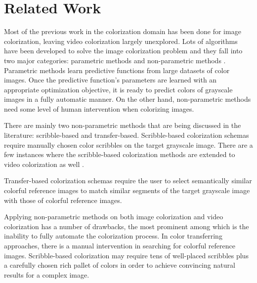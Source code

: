 \documentclass[10pt,twocolumn,letterpaper]{article}
\begin{document}
\section{Related Work}

Most of the previous work in the colorization domain has been done for image colorization, leaving video colorization largely unexplored. Lots of algorithms have been developed to solve the image colorization problem and they fall into two major categories: parametric methods \cite{DBLP:journals/corr/abs-1712-03400, DBLP:journals/corr/ChengYS16, 7410429, Iizuka:2016:LCJ:2897824.2925974, DBLP:journals/corr/LarssonMS16, DBLP:journals/corr/ZhangIE16, DBLP:journals/corr/ZhangZIGLYE17} and non-parametric methods \cite{10.1007/978-3-540-88690-7_10, Chia:2011:SCI:2070781.2024190, Gupta:2012:ICU:2393347.2393402, Huang:2005:AED:1101149.1101223, Irony:2005:CE:2383654.2383683, Levin:2004:CUO:1015706.1015780, Luan:2007:NIC:2383847.2383887, Morimoto:2009:ACG:1599301.1599333, qu-2006-manga, 1467343, Welsh:2002:TCG:566654.566576, 1621234}. Parametric methods learn predictive functions from large datasets of color images. Once the predictive function's parameters are learned with an appropriate optimization objective, it is ready to predict colors of grayscale images in a fully automatic manner. On the other hand, non-parametric methods need some level of human intervention when colorizing images.  

There are mainly two non-parametric methods that are being discussed in the literature: scribble-based and transfer-based. Scribble-based colorization schemas \cite{Huang:2005:AED:1101149.1101223, Levin:2004:CUO:1015706.1015780, Luan:2007:NIC:2383847.2383887, qu-2006-manga, 1621234} require manually chosen color scribbles on the target grayscale image. There are a few instances where the scribble-based colorization methods are extended to video colorization as well \cite{Levin:2004:CUO:1015706.1015780, 1621234}. 

Transfer-based colorization schemas \cite{10.1007/978-3-540-88690-7_10, Chia:2011:SCI:2070781.2024190, Gupta:2012:ICU:2393347.2393402, Irony:2005:CE:2383654.2383683, Morimoto:2009:ACG:1599301.1599333, 1467343, Welsh:2002:TCG:566654.566576} require the user to select semantically similar colorful reference images to match similar segments of the target grayscale image with those of colorful reference images. 

Applying non-parametric methods on both image colorization and video colorization has a number of drawbacks, the most prominent among which is the inability to fully automate the colorization process. In color transferring approaches, there is a manual intervention in searching for colorful reference images. Scribble-based colorization may require tens of well-placed scribbles plus a carefully chosen rich pallet of colors in order to achieve convincing natural results for a complex image.  
\end{document}
